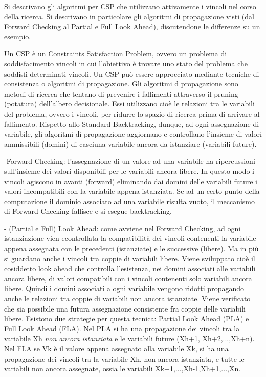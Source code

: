 \documentclass[answers, a4paper, 11pt]{exam}
\begin{document}
\begin{questions}
\question Si descrivano gli algoritmi per CSP che utilizzano attivamente i vincoli nel corso della ricerca. Si descrivano in particolare gli algoritmi di propagazione visti (dal Forward Checking al Partial e Full Look Ahead), discutendone le differenze su un esempio.
\begin{solution}
Un CSP è un Constraints Satisfaction Problem, ovvero un problema di soddisfacimento vincoli in cui l'obiettivo è trovare uno stato del problema che soddisfi determinati vincoli.
Un CSP può essere approcciato mediante tecniche di consistenza o algoritmi di propagazione. Gli algoritmi d propagazione sono metodi di ricerca che tentano di prevenire i fallimenti attraverso il pruning (potatura) dell'albero decisionale. Essi utilizzano cioè le relazioni tra le variabili del problema, ovvero i vincoli, per ridurre lo spazio 
di ricerca prima di arrivare al fallimento. Rispetto allo Standard Backtracking, dunque, ad ogni assegnazione di variabile, gli algoritmi di propagazione aggiornano e controllano l'insieme di valori ammissibili (domini) di casciuna variabile ancora da istanziare (variabili future).

-Forward Checking: l'assegnazione di un valore ad una variabile ha ripercussioni sull'insieme dei valori disponibili per le variabili ancora libere. In questo modo i vincoli agiscono in avanti (forward) eliminando dai domini delle variabili future i valori incompatibili con la variabile appena istanziata. Se ad un certo punto della computazione il dominio associato ad una variabile risulta vuoto, il meccanismo di Forward Checking fallisce e si esegue backtracking.

- (Partial e Full) Look Ahead: come avviene nel Forward Checking, ad ogni istanziazione vien econtrollata la compatibilità dei vincoli contenenti la variabile appena assegnata con le precedenti (istanziate) e le successive (libere). Ma in più si guardano anche i vincoli tra coppie di variabili libere. Viene sviluppato cioè il cosiddetto look ahead che controlla l'esistenza, nei domini associati alle variabili ancora libere, di valori compatibili con i vincoli contenenti solo variabili ancora libere.
Quindi i domini associati a ogni variabile vengono ridotti propagando anche le relazioni tra coppie di variabili non ancora istanziate. Viene verificato che sia possibile una futura assegnazione consistente fra coppie delle variabili libere.
Esistono due strategie per questa tecnica: Partial Look Ahead (PLA) e Full Look Ahead (FLA). Nel PLA si ha una propagazione dei vincoli tra la variabile Xh \emph{non ancora istanziata} e le variabili future (Xh+1, Xh+2,...,Xh+n). 
Nel FLA se Vk è il valore appena assegnato alla variabile Xk, si ha una propagazione dei vincoli tra la variabile Xh, non ancora istanziata, e tutte le variabili non ancora assegnate, ossia le variabili Xk+1,...,Xh-1,Xh+1,...,Xn.


\end{solution}
\end{questions}
\end{document}
